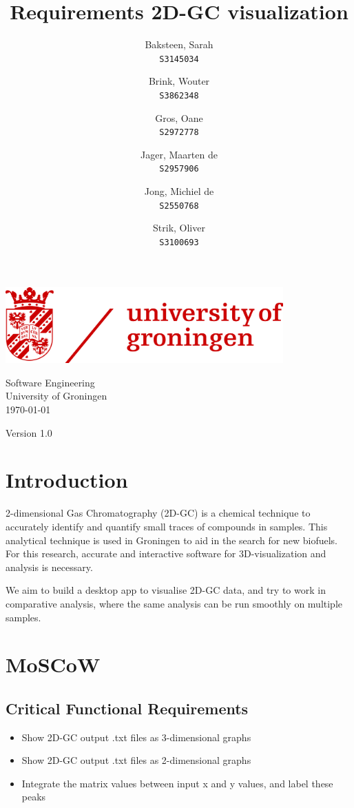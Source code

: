 \documentclass{article}
\title{Requirements 2D-GC visualization}
\author{
  Baksteen, Sarah\\
  \texttt{S3145034}
  \and
  Brink, Wouter\\
  \texttt{S3862348}
  \and
  Gros, Oane\\
  \texttt{S2972778}
  \and
  Jager, Maarten de \\
  \texttt{S2957906}
  \and
  Jong, Michiel de \\
  \texttt{S2550768}
  \and
  Strik, Oliver\\
  \texttt{S3100693}
}
\date{}
\begin{document}
\clearpage
\maketitle
\thispagestyle{empty}
\begin{center}
    \vfill
    \includegraphics[width=0.8\textwidth]{UG_logo.jpg}
    \vfill
    
    \Large
        Software Engineering \\
        University of Groningen \\
        \today \\
        \empty
        
        \vspace{1cm}
        Version 1.0
        \vspace{1cm}
\end{center}

\newpage\setcounter{page}{1}
\section{Introduction}

2-dimensional Gas Chromatography (2D-GC) is a chemical technique to accurately identify and quantify small traces of compounds in samples. This analytical technique is used in Groningen to aid in the search for new biofuels. For this research, accurate and interactive software for 3D-visualization and analysis is necessary. 

We aim to build a desktop app to visualise 2D-GC data, and try to work in comparative analysis, where the same analysis can be run smoothly on multiple samples. 

\section{MoSCoW}
\subsection*{Critical Functional Requirements}
\begin{itemize}
	\item Show 2D-GC output .txt files as 3-dimensional graphs
	\item Show 2D-GC output .txt files as 2-dimensional graphs
    \item Integrate the matrix values between input x and y values, and label these peaks
\end{itemize}
\end{document}
